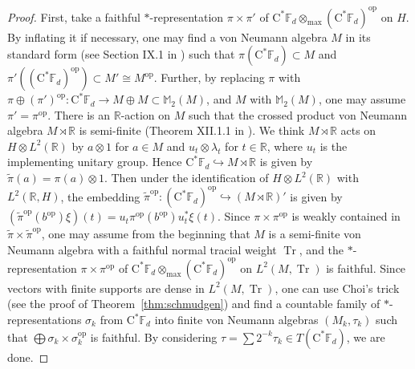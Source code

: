 \documentclass[12pt]{amsart}
\theoremstyle{definition}
\begin{document}
\begin{proof}
First, take a faithful {$*$-repre\-sen\-ta\-tion\xspace} $\pi\times\pi'$ of
$\mathrm{C^*}{{\mathbb F}}_d\otimes_{\max}(\mathrm{C^*}{{\mathbb F}}_d)^{\mathrm{op}}$ on ${H}$.
By inflating it if necessary, one may find a von Neumann algebra $M$
in its standard form (see Section IX.1 in \cite{takesakiII})
such that $\pi(\mathrm{C^*}{{\mathbb F}}_d)\subset M$ and $\pi'((\mathrm{C^*}{{\mathbb F}}_d)^{\mathrm{op}})\subset M'\cong M^{\mathrm{op}}$.
Further, by replacing $\pi$ with
$\pi\oplus(\pi')^{\mathrm{op}}\colon \mathrm{C^*}{{\mathbb F}}_d\to M\oplus M\subset{{\mathbb M}}_2(M)$,
and $M$ with ${{\mathbb M}}_2(M)$, one may assume $\pi'=\pi^{\mathrm{op}}$.
There is an ${{\mathbb R}}$-action on $M$ such that the crossed product
von Neumann algebra $M\rtimes{{\mathbb R}}$ is semi-finite (Theorem XII.1.1 in \cite{takesakiII}).
We think $M\rtimes{{\mathbb R}}$ acts on ${H}\otimes L^2({{\mathbb R}})$ by
$a\otimes 1$ for $a\in M$ and $u_t\otimes\lambda_t$ for $t\in{{\mathbb R}}$, where $u_t$
is the implementing unitary group.
Hence $\mathrm{C^*}{{\mathbb F}}_d\hookrightarrow M\rtimes{{\mathbb R}}$ is given by $\tilde{\pi}(a)=\pi(a)\otimes1$.
Then under the identification of ${H}\otimes L^2({{\mathbb R}})$ with $L^2({{\mathbb R}},{H})$,
the embedding $\tilde{\pi}^{\mathrm{op}}\colon (\mathrm{C^*}{{\mathbb F}}_d)^{\mathrm{op}}\hookrightarrow (M\rtimes{{\mathbb R}})'$ is given by
$(\tilde{\pi}^{\mathrm{op}}(b^{\mathrm{op}})\xi)(t)=u_t\pi^{\mathrm{op}}(b^{\mathrm{op}})u_t^*\xi(t)$.
Since $\pi\times\pi^{\mathrm{op}}$ is weakly contained in $\tilde{\pi}\times\tilde{\pi}^{\mathrm{op}}$,
one may assume from the beginning that $M$ is a semi-finite von Neumann algebra with
a faithful normal tracial weight $\operatorname*{Tr}$, and the {$*$-repre\-sen\-ta\-tion\xspace} $\pi\times\pi^{\mathrm{op}}$ of
$\mathrm{C^*}{{\mathbb F}}_d\otimes_{\max}(\mathrm{C^*}{{\mathbb F}}_d)^{\mathrm{op}}$ on $L^2(M,\operatorname*{Tr})$ is faithful.
Since vectors with finite supports are dense in $L^2(M,\operatorname*{Tr})$, one can use Choi's trick
(see the proof of Theorem~\ref{thm:schmudgen}) and find a countable family of
{$*$-repre\-sen\-ta\-tion\xspace}{}s $\sigma_k$ from $\mathrm{C^*}{{\mathbb F}}_d$ into finite von Neumann algebras
$(M_k,\tau_k)$ such that $\bigoplus\sigma_k\times\sigma^{\mathrm{op}}_k$ is faithful.
By considering $\tau=\sum2^{-k}\tau_k\in T(\mathrm{C^*}{{\mathbb F}}_d)$, we are done.
\end{proof}
\end{document}
